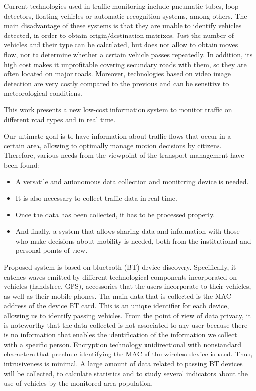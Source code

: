 \documentclass{llncs}
\begin{document}
Current technologies used in traffic monitoring include pneumatic tubes, loop detectors, floating vehicles or automatic recognition systems, among others. The main disadvantage of these systems is that they are unable to identify vehicles detected, in order to obtain origin/destination matrixes. Just the number of vehicles and their type can be calculated, but does not allow to obtain moves flow, nor to determine whether a certain vehicle passes repeatedly. In addition, its high cost makes it unprofitable covering secundary roads with them, so they are often located on major roads. Moreover, technologies based on video image detection are very costly compared to the previous and can be sensitive to meteorological conditions.

This work presents a new low-cost information system to monitor traffic on different road types and in real time.

Our ultimate goal is to have information about traffic flows that occur in a certain area, allowing to optimally manage motion decisions by citizens.
Therefore, various needs from the viewpoint of the transport management have been found:

\begin{itemize}
  \item A versatile and autonomous data collection and monitoring device is needed.
  \item It is also necessary to collect traffic data in real time.
  \item Once the data has been collected, it has to be processed properly.
  \item And finally, a system that allows sharing data and information with those who make decisions about mobility is needed, both from the institutional and personal points of view.
\end{itemize}


Proposed system is based on bluetooth (BT) device discovery. 
Specifically, it catches waves emitted by different technological components incorporated on vehicles (handsfree, {GPS}), accessories that the users incorporate to their vehicles, as well as their mobile phones.
The main data that is collected is the MAC address of the device BT card.
This is an unique identifier for each device, allowing us to identify passing vehicles.
From the point of view of data privacy, it is noteworthy that the data collected is not associated to any user because there is no information that enables the identification of the information we collect with a specific person. 
Encryption technology unidirectional with nonstandard characters that preclude identifying the MAC of the wireless device is used. Thus, intrusiveness is minimal.
A large amount of data related to passing BT devices will be collected, to calculate statistics and to study several indicators about the use of vehicles by the monitored area population.
\end{document}
